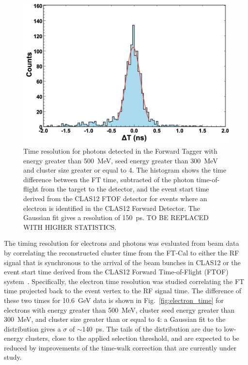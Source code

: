 \begin{figure}[h]
\includegraphics[height=0.6\columnwidth]{fig/ft_gamma_time.png}
\caption{Time resolution for photons detected in the Forward Tagger with energy greater than 500~MeV, seed
  energy greater than 300~MeV and cluster size greater or equal to 4. The histogram shows the time difference
  between the FT time, subtracted of the photon time-of-flight from the target to the detector, and the event start
  time derived from the CLAS12 FTOF detector for events where an electron is identified in the CLAS12 Forward
  Detector. The Gaussian fit gives a resolution of 150~ps. TO BE REPLACED WITH HIGHER STATISTICS.}
\label{fig:gamma_time}
\end{figure}

The timing resolution for electrons and photons was evaluated from beam data by correlating the reconstructed
cluster time from the FT-Cal to either the RF signal that is synchronous to the arrival of the beam bunches in
CLAS12 or the event start time derived from the CLAS12 Forward Time-of-Flight (FTOF) system~\cite{ftof}.
Specifically, the electron time resolution was studied correlating the FT time projected back to the event vertex
to the RF signal time. The difference of these two times for 10.6~GeV data is shown in Fig.~\ref{fig:electron_time}
for electrons with energy greater than 500~MeV, cluster seed energy greater than 300~MeV, and cluster size
greater than or equal to 4: a Gaussian fit to the distribution gives a $\sigma$ of $\sim$140~ps. The tails of the
distribution are due to low-energy clusters, close to the applied selection threshold, and are expected to be reduced
by improvements of the time-walk correction that are currently under study.

